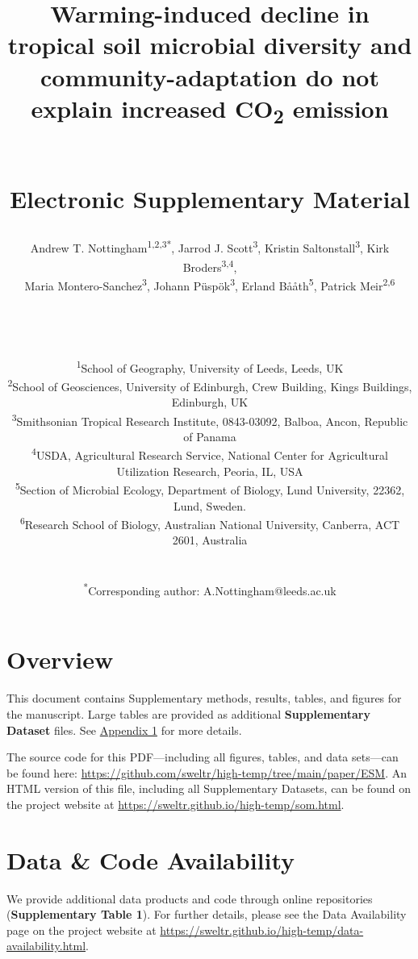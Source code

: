 \documentclass[
  10pt,
  letterpaper,
  DIV=11,
  numbers=noendperiod]{scrartcl}
\date{}
\title{\LARGE Warming-induced decline in tropical soil microbial
diversity and community-adaptation do not explain increased
CO\textsubscript{2} emission\\
\strut \\
Electronic Supplementary Material}
\author{Andrew T. Nottingham\textsuperscript{1,2,3*}, Jarrod J.
Scott\textsuperscript{3}, Kristin Saltonstall\textsuperscript{3}, Kirk
Broders\textsuperscript{3,4},\\
Maria Montero-Sanchez\textsuperscript{3}, Johann
Püspök\textsuperscript{3}, Erland Bååth\textsuperscript{5}, Patrick
Meir\textsuperscript{2,6}\\
\strut \\
\strut \\
\RaggedRight \small \textsuperscript{1}School of Geography, University
of Leeds, Leeds, UK\\
\small \textsuperscript{2}School of Geosciences, University of
Edinburgh, Crew Building, Kings Buildings, Edinburgh, UK\\
\small \textsuperscript{3}Smithsonian Tropical Research Institute,
0843-03092, Balboa, Ancon, Republic of Panama\\
\small \textsuperscript{4}USDA, Agricultural Research Service, National
Center for Agricultural Utilization Research, Peoria, IL, USA\\
\small \textsuperscript{5}Section of Microbial Ecology, Department of
Biology, Lund University, 22362, Lund, Sweden.\\
\small \textsuperscript{6}Research School of Biology, Australian
National University, Canberra, ACT 2601, Australia\\
\strut \\
\small \textsuperscript{*}Corresponding author:
A.Nottingham@leeds.ac.uk}
\date{}
\renewcommand*\contentsname{Table of contents}
\newcommand\contentsname{Table of contents}
\begin{document}
\maketitle
\ifdefined\Shaded\renewenvironment{Shaded}{\begin{tcolorbox}[interior hidden, breakable, boxrule=0pt, enhanced, sharp corners, borderline west={3pt}{0pt}{shadecolor}, frame hidden]}{\end{tcolorbox}}\fi

\renewcommand*\contentsname{Contents}
{
\hypersetup{linkcolor=}
\setcounter{tocdepth}{2}
\tableofcontents
}
\listoffigures
\listoftables
\hypertarget{overview}{%
\section{Overview}\label{overview}}

This document contains Supplementary methods, results, tables, and
figures for the manuscript. Large tables are provided as additional
\textbf{Supplementary Dataset} files. See
\hyperref[appendix-1]{\color{blue}Appendix 1} for more details.

\begin{tcolorbox}[enhanced jigsaw, arc=.35mm, left=2mm, rightrule=.15mm, leftrule=.75mm, colback=white, breakable, bottomrule=.15mm, opacityback=0, colframe=quarto-callout-note-color-frame, toprule=.15mm]
The source code for this PDF---including all figures, tables, and data
sets---can be found here:
\url{https://github.com/sweltr/high-temp/tree/main/paper/ESM}. An HTML
version of this file, including all Supplementary Datasets, can be found
on the project website at
\url{https://sweltr.github.io/high-temp/som.html}.
\end{tcolorbox}

\hypertarget{data-code-availability}{%
\section{Data \& Code Availability}\label{data-code-availability}}

We provide additional data products and code through online repositories
(\textbf{Supplementary Table 1}). For further details, please see the
Data Availability page on the project website at
\url{https://sweltr.github.io/high-temp/data-availability.html}.
\end{document}
